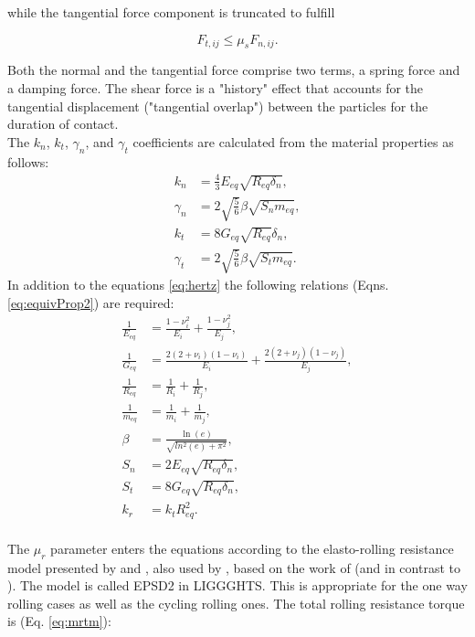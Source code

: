 \documentclass{CFD2015}
\begin{document}
while the tangential force component is truncated to fulfill

\begin{equation}
F_{t,ij} \leq \mu_s F_{n,ij}.
 \label{eq:force_t}
\end{equation}

Both the normal and the tangential force comprise two terms, a spring force and a damping force. The shear force is a "history" effect that accounts for the tangential displacement ("tangential overlap") between the particles for the duration of contact. \\

The $k_n$, $k_t$, $\gamma_n$, and $\gamma_t$ coefficients are calculated from the material properties as follows:
\begin{equation}
\begin{aligned}
	k_n &= \frac{4}{3} E_{eq} \sqrt{R_{eq} \delta_n} ,\\
	\gamma_n &= 2 \sqrt{\frac{5}{6}} \beta \sqrt{S_n m_{eq}} ,\\
	k_t &= 8 G_{eq} \sqrt{R_{eq}} \delta_n ,\\
	\gamma_t &= 2 \sqrt{\frac{5}{6}} \beta \sqrt{S_t m_{eq}} .
\end{aligned}
\label{eq:hertz}
\end{equation}
%
In addition to the equations \ref{eq:hertz} the following relations (Eqns. \ref{eq:equivProp2}) are required:
%
\begin{equation}
\begin{aligned}
 \frac{1}{E_{eq}} & = \frac{1-\nu_i^2}{E_i} + \frac{1-\nu_j^2}{E_j} ,\\
 \frac{1}{G_{eq}} & = \frac{2(2+\nu_i)(1-\nu_i)}{E_i} + \frac{2(2+\nu_j)(1-\nu_j)}{E_j} ,\\
 \frac{1}{R_{eq}} &= \frac{1}{R_i} + \frac{1}{R_j} ,\\
 \frac{1}{m_{eq}} &= \frac{1}{m_i} + \frac{1}{m_j} ,\\
 \beta & = \frac{\ln(e)}{\sqrt{ln^2(e)+\pi^2}} ,\\
 S_n & = 2 E_{eq} \sqrt{R_{eq} \delta_n} ,\\
 S_t & = 8 G_{eq} \sqrt{R_{eq} \delta_n} ,\\
 k_r & = k_t R_{eq}^2 .\\
\end{aligned}
\label{eq:equivProp2}
\end{equation}

The $\mu_r$ parameter enters the equations according to the elasto-rolling resistance model presented by \citet{RefWorks:87} and \citet{RefWorks:131}, also used by \citet{RefWorks:147}, based on the work of \citet{RefWorks:143}(and in contrast to \citet{RefWorks:144}). The model is called EPSD2 in LIGGGHTS.
This is appropriate for the one way rolling cases as well as the cycling rolling ones.
The total rolling resistance torque is (Eq. \ref{eq:mrtm}):
\end{document}
